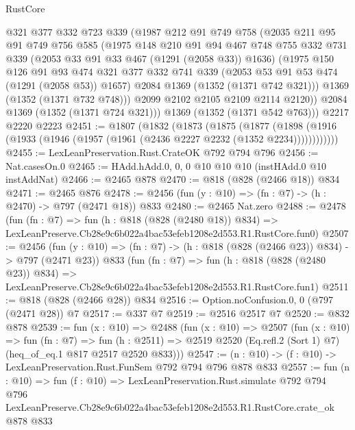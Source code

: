 \begin{lexlean}{RustCore}
\begin{coremodule}
        @321
        @377
        @332
        @723
        @339
        (@1987
          @212
          @91
          @749
          @758
          (@2035
            @211
            @95
            @91
            @749
            @756
            @585
            (@1975
              @148
              @210
              @91
              @94
              @467
              @748
              @755
              @332
              @731
              @339
              (@2053 @33 @91 @33 @467 (@1291 (@2058 @33)) @1636)
              (@1975
                @150
                @126
                @91
                @93
                @474
                @321
                @377
                @332
                @741
                @339
                (@2053 @53 @91 @53 @474 (@1291 (@2058 @53)) @1657)
                @2084
                @1369
                (@1352 (@1371 @742 @321)))
              @1369
              (@1352 (@1371 @732 @748)))
            @2099
            @2102
            @2105
            @2109
            @2114
            @2120))
        @2084
        @1369
        (@1352 (@1371 @724 @321)))
      @1369
      (@1352 (@1371 @542 @763)))
    @2217
    @2220
    @2223
@2451 := @1807
    (@1832
      (@1873
        (@1875
          (@1877
            (@1898 (@1916 (@1933 (@1946 (@1957 (@1961 (@2436 @2227 @2232 (@1352 @2234))))))))))))
@2455 := LexLeanPreservation.Rust.CrateOK @792 @794 @796
@2456 := Nat.casesOn.{0}
@2465 := HAdd.hAdd.{0, 0, 0} @10 @10 @10 (instHAdd.{0} @10 instAddNat)
@2466 := @2465 @878
@2470 := @818 (@828 (@2466 @18)) @834
@2471 := @2465 @876
@2478 := @2456 (fun (y : @10) => (fn : @7) -> (h : @2470) -> @797 (@2471 @18)) @833
@2480 := @2465 Nat.zero
@2488 := @2478
    (fun (fn : @7) =>
    fun (h : @818 (@828 (@2480 @18)) @834) =>
    LexLeanPreserve.Cb28e9c6b022a4bac53efeb1208e2d553.R1.RustCore.fun0)
@2507 := @2456
    (fun (y : @10) => (fn : @7) -> (h : @818 (@828 (@2466 @23)) @834) -> @797 (@2471 @23))
    @833
    (fun (fn : @7) =>
    fun (h : @818 (@828 (@2480 @23)) @834) =>
    LexLeanPreserve.Cb28e9c6b022a4bac53efeb1208e2d553.R1.RustCore.fun1)
@2511 := @818 (@828 (@2466 @28)) @834
@2516 := Option.noConfusion.{0, 0} (@797 (@2471 @28)) @7
@2517 := @337 @7
@2519 := @2516 @2517 @7
@2520 := @832 @878
@2539 := fun (x : @10) =>
  @2488
    (fun (x : @10) =>
    @2507
      (fun (x : @10) =>
      fun (fn : @7) =>
      fun (h : @2511) =>
      @2519 @2520 (Eq.refl.{2} (Sort 1) @7) (heq_of_eq.{1} @817 @2517 @2520 @833)))
@2547 := (n : @10) -> (f : @10) -> LexLeanPreservation.Rust.FunSem @792 @794 @796 @878 @833
@2557 := fun (n : @10) =>
  fun (f : @10) =>
  LexLeanPreservation.Rust.simulate
    @792
    @794
    @796
    LexLeanPreserve.Cb28e9c6b022a4bac53efeb1208e2d553.R1.RustCore.crate_ok
    @878
    @833
\end{coremodule}
\end{lexlean}
